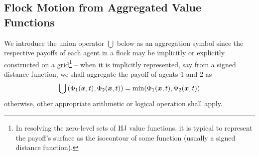 \subsection{Flock Motion from Aggregated Value Functions}
We introduce the union operator \ie $\bigcup$ below as an aggregation symbol since the respective payoffs of each agent in a flock may be implicitly or explicitly constructed  on a grid\footnote{In resolving the zero-level sets of HJ value functions, it is typical to represent the payoff's surface as the isocontour of some function (usually a signed distance function).} -- when it is implicitly represented, say from a signed distance function, we shall aggregate the  payoff of agents 1 and 2 as
%
\begin{align}
	\bigcup\left(\Phi_1(\bm{x}, t), \Phi_2(\bm{x}, t)\right) = 	\min(\Phi_1(\bm{x}, t), \Phi_2(\bm{x}, t))
	\label{eq:sdf_union}
\end{align}
%
otherwise, other appropriate arithmetic or logical operation shall apply.

